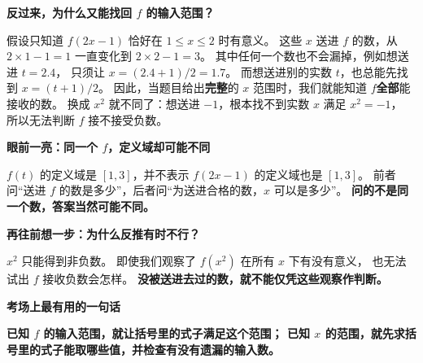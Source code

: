 \begin{explanationbox}
\medskip
\textbf{\textcolor{CExplanation}{反过来，为什么又能找回 $f$ 的输入范围？}}

假设只知道 $f(2x-1)$ 恰好在 $1\le x\le2$ 时有意义。
这些 $x$ 送进 $f$ 的数，从 $2\times1-1=1$ 一直变化到 $2\times2-1=3$。
其中任何一个数也不会漏掉，例如想送进 $t=2.4$，
只须让 $x=(2.4+1)/2=1.7$。
而想送进别的实数 $t$，也总能先找到 $x=(t+1)/2$。
因此，当题目给出\textbf{完整}的 $x$ 范围时，我们就能知道 $f$\textbf{全部}能接收的数。
换成 $x^2$ 就不同了：想送进 $-1$，根本找不到实数 $x$ 满足 $x^2=-1$，
所以无法判断 $f$ 接不接受负数。

\medskip

\textbf{\textcolor{CExplanation}{眼前一亮：同一个 $f$，定义域却可能不同}}

$f(t)$ 的定义域是 $[1,3]$，并不表示 $f(2x-1)$ 的定义域也是 $[1,3]$。
前者问“送进 $f$ 的数是多少”，后者问“为送进合格的数，$x$ 可以是多少”。
\textbf{问的不是同一个数，答案当然可能不同。}

\medskip
\textbf{\textcolor{CExplanation}{再往前想一步：为什么反推有时不行？}}

$x^2$ 只能得到非负数。
即使我们观察了 $f(x^2)$ 在所有 $x$ 下有没有意义，
也无法试出 $f$ 接收负数会怎样。
\textbf{没被送进去过的数，就不能仅凭这些观察作判断。}

\medskip
\textbf{\textcolor{CExplanation}{考场上最有用的一句话}}

\textbf{已知 $f$ 的输入范围，就让括号里的式子满足这个范围；
已知 $x$ 的范围，就先求括号里的式子能取哪些值，并检查有没有遗漏的输入数。}
\end{explanationbox}
